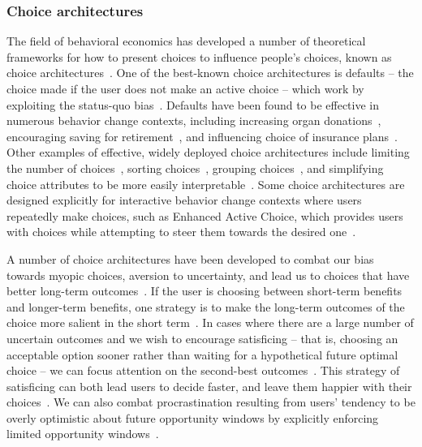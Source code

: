 \subsubsection{Choice architectures}

The field of behavioral economics has developed a number of theoretical frameworks for how to present choices to influence people's choices, known as choice architectures~\cite{thaler1980toward, thaler2009nudge, johnson2012beyond}. One of the best-known choice architectures is defaults -- the choice made if the user does not make an active choice -- which work by exploiting the status-quo bias~\cite{samuelson1988status}. Defaults have been found to be effective in numerous behavior change contexts, including increasing organ donations~\cite{johnson2003defaults}, encouraging saving for retirement~\cite{cronqvist2004design, madrian2001power}, and influencing choice of insurance plans~\cite{johnson1993framing}. Other examples of effective, widely deployed choice architectures include limiting the number of choices~\cite{cronqvist2004design, kling2008misperception}, sorting choices~\cite{lynch2000wine}, grouping choices~\cite{fox2005subjective}, and simplifying choice attributes to be more easily interpretable~\cite{peters2009bringing, soll2013consumer}. Some choice architectures are designed explicitly for interactive behavior change contexts where users repeatedly make choices, such as Enhanced Active Choice, which provides users with choices while attempting to steer them towards the desired one~\cite{keller2011enhanced}.


A number of choice architectures have been developed to combat our bias towards myopic choices, aversion to uncertainty, and lead us to choices that have better long-term outcomes~\cite{johnson2012beyond}. If the user is choosing between short-term benefits and longer-term benefits, one strategy is to make the long-term outcomes of the choice more salient in the short term~\cite{weber2007asymmetric, soman2005psychology}. In cases where there are a large number of uncertain outcomes and we wish to encourage satisficing -- that is, choosing an acceptable option sooner rather than waiting for a hypothetical future optimal choice -- we can focus attention on the second-best outcomes~\cite{shu2008future}. This strategy of satisficing can both lead users to decide faster, and leave them happier with their choices~\cite{iyengar2006doing}. We can also combat procrastination resulting from users' tendency to be overly optimistic about future opportunity windows by explicitly enforcing limited opportunity windows~\cite{o1998procrastination}.




